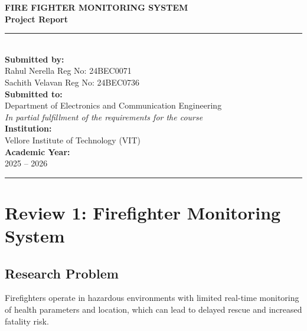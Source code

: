 \documentclass[12pt,a4paper]{article}
\begin{document}
	
	\begin{titlepage}
		\centering
		\vspace*{1cm}
		{\LARGE\bfseries FIRE FIGHTER MONITORING SYSTEM\\[0.4em]
			Project Report\par}
		\vspace{1.5cm}
		\rule{\linewidth}{0.5mm}\\[0.4cm]
		
		\textbf{Submitted by:}\\[0.3em]
		Rahul Nerella \quad Reg No: 24BEC0071\\
		Sachith Velavan \quad Reg No: 24BEC0736\\[1cm]
		
		\textbf{Submitted to:}\\[0.3em]
		Department of Electronics and Communication Engineering\\[1cm]
		
		\textit{In partial fulfillment of the requirements for the course}\\[1cm]
		
		\textbf{Institution:}\\[0.3em]
		Vellore Institute of Technology (VIT)\\[1cm]
		
		\textbf{Academic Year:}\\[0.3em]
		2025 -- 2026\\[2cm]
		
		\rule{\linewidth}{0.5mm}
	\end{titlepage}
	
	\tableofcontents
	\newpage
	
	\section{Review 1: Firefighter Monitoring System}
	
	\subsection{Research Problem}
	Firefighters operate in hazardous environments with limited real-time monitoring of health parameters and location, which can lead to delayed rescue and increased fatality risk.
	
\end{document}
